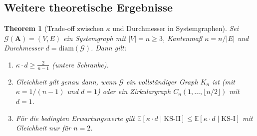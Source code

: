 \documentclass[a4paper, 12pt, twoside, openright]{report}
\newtheorem{theorem}{Theorem}[section]
\theoremstyle{definition}
\theoremstyle{definition}
\newcommand{\vA}{\bm{A}}
\newcommand{\KS}{\mathrm{KS}}
\begin{document}
\subsection{Weitere theoretische Ergebnisse}

\begin{theorem}[Trade-off zwischen $\kappa$ und Durchmesser in Systemgraphen]
\label{thm:tradeoff}
Sei $\mathcal{G}(\vA) = (V, E)$ ein Systemgraph mit $|V| = n \geq 3$, Kantenmaß
$\kappa = n/|E|$ und Durchmesser $d = \mathrm{diam}(\mathcal{G})$. Dann gilt:
\begin{enumerate}[label=(\roman*)]
  \item $\kappa \cdot d \geq \frac{2}{n-1}$ \quad (untere Schranke).
  \item Gleichheit gilt genau dann, wenn $\mathcal{G}$ ein vollständiger Graph
    $K_n$ ist (mit $\kappa = 1/(n-1)$ und $d = 1$) oder ein Zirkulargraph
    $C_n(1, \ldots, \lfloor n/2 \rfloor)$ mit $d = 1$.
  \item Für die bedingten Erwartungswerte gilt
    $\mathbb{E}[\kappa \cdot d \mid \KS\text{-II}] \leq
     \mathbb{E}[\kappa \cdot d \mid \KS\text{-I}]$
    mit Gleichheit nur für $n = 2$.
\end{enumerate}
\end{theorem}
\end{document}
